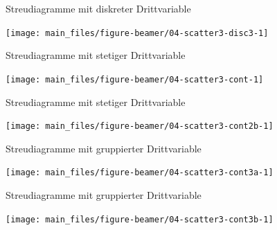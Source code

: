 \documentclass[
  10pt,
  ignorenonframetext,
]{beamer}
\begin{document}
\begin{frame}{Streudiagramme mit diskreter Drittvariable}
\label{streudiagramme-mit-diskreter-drittvariable-2}
\scriptsize

\begin{center}\texttt{[image: main\_files/figure-beamer/04-scatter3-disc3-1]} \end{center}

\normalsize
\end{frame}

\begin{frame}{Streudiagramme mit stetiger Drittvariable}
\label{streudiagramme-mit-stetiger-drittvariable}
\scriptsize

\begin{center}\texttt{[image: main\_files/figure-beamer/04-scatter3-cont-1]} \end{center}

\normalsize
\end{frame}

\begin{frame}{Streudiagramme mit stetiger Drittvariable}
\label{streudiagramme-mit-stetiger-drittvariable-1}
\scriptsize

\begin{center}\texttt{[image: main\_files/figure-beamer/04-scatter3-cont2b-1]} \end{center}

\normalsize
\end{frame}

\begin{frame}{Streudiagramme mit gruppierter Drittvariable}
\label{streudiagramme-mit-gruppierter-drittvariable}
\scriptsize

\begin{center}\texttt{[image: main\_files/figure-beamer/04-scatter3-cont3a-1]} \end{center}

\normalsize
\end{frame}

\begin{frame}{Streudiagramme mit gruppierter Drittvariable}
\label{streudiagramme-mit-gruppierter-drittvariable-1}
\scriptsize

\begin{center}\texttt{[image: main\_files/figure-beamer/04-scatter3-cont3b-1]} \end{center}

\normalsize
\end{frame}
\end{document}
